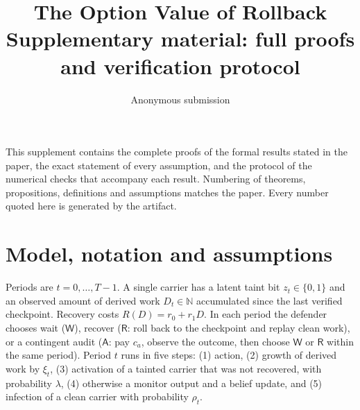 \documentclass[11pt]{article}
\title{The Option Value of Rollback\\[2pt]\large Supplementary material: full proofs and verification protocol}
\author{Anonymous submission}
\date{}
\theoremstyle{definition}
\newcommand{\Wa}{\mathsf{W}}
\newcommand{\Aa}{\mathsf{A}}
\newcommand{\Ra}{\mathsf{R}}
\begin{document}
\maketitle

\noindent This supplement contains the complete proofs of the formal results stated in the paper,
the exact statement of every assumption, and the protocol of the numerical checks that accompany
each result. Numbering of theorems, propositions, definitions and assumptions matches the paper.
Every number quoted here is generated by the artifact.

\section{Model, notation and assumptions}

Periods are $t=0,\dots,T-1$. A single carrier has a latent taint bit $z_t\in\{0,1\}$ and an observed
amount of derived work $D_t\in\mathbb{N}$ accumulated since the last verified checkpoint. Recovery
costs $R(D)=r_0+r_1D$. In each period the defender chooses wait ($\Wa$), recover ($\Ra$: roll back to
the checkpoint and replay clean work), or a contingent audit ($\Aa$: pay $c_a$, observe the outcome,
then choose $\Wa$ or $\Ra$ within the same period). Period $t$ runs in five steps: (1) action, (2) growth of derived work by $\xi_t$, (3) activation of a
tainted carrier that was not recovered, with probability $\lambda$, (4) otherwise a monitor output and
a belief update, and (5) infection of a clean carrier with probability $\rho_t$.
\end{document}
